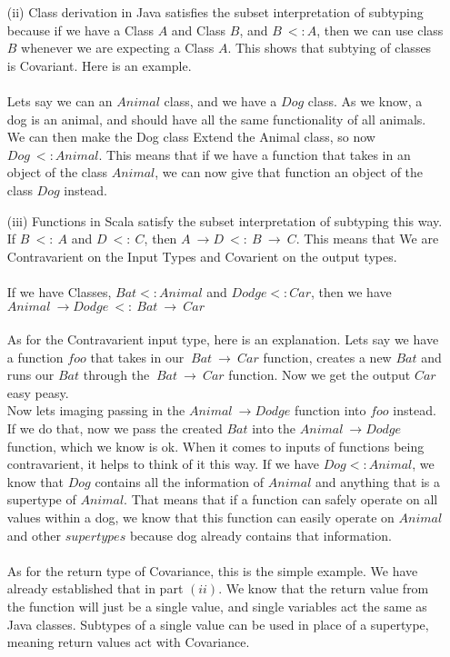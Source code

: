 \documentclass[11pt]{article}
\begin{document}
\begin{enumerate}
\begin{enumerate}
\begin{enumerate}
\item[(ii)]  Class derivation in Java satisfies the subset interpretation of subtyping because if we have a Class $A$ and Class $B$, and $B\ <: A$, then we can use class $B$ whenever we are expecting a Class $A$.  This shows that subtying of classes is Covariant.  Here is an example.
\\\\
Lets say we can an $Animal$ class, and we have a $Dog$ class.  As we know, a dog is an animal, and should have all the same functionality of all animals.  We can then make the Dog class Extend the Animal class, so now $Dog\ <: Animal$.  This means that if we have a function that takes in an object of the class $Animal$, we can now give that function an object of the class $Dog$ instead.\\
\item[(iii)]  Functions in Scala satisfy the subset interpretation of subtyping this way. \\
If $B\ <:\ A$ and $D\ <:\ C$, then $A\ \rightarrow D\ <:\ B\ \rightarrow\ C$.  This means that We are Contravarient on the Input Types and Covarient on the output types.\\ \\
If we have Classes, $Bat <: Animal$ and $Dodge <: Car$, then we have \\
$Animal\ \rightarrow Dodge\ <:\ Bat\ \rightarrow\ Car$
\\ \\
As for the Contravarient input type, here is an explanation.   Lets say we have a function $foo$ that takes in our $\ Bat\ \rightarrow\ Car$ function, creates a new $Bat$ and runs our $Bat$ through the  $\ Bat\ \rightarrow\ Car$ function.  Now we get the output $Car$ easy peasy.
\\ 
Now lets imaging passing in the $Animal\ \rightarrow Dodge$ function into $foo$ instead.  If we do that, now we pass the created $Bat$ into the $Animal\ \rightarrow Dodge$ function, which we know is ok.  When it comes to inputs of functions being contravarient, it helps to think of it this way.  If we have $Dog <: Animal$, we know that $Dog$ contains all the information of $Animal$ and anything that is a supertype of $Animal$.  That means that if a function can safely operate on all values within a dog, we know that this function can easily operate on $Animal$ and other $supertypes$ because dog already contains that information.\\ \\
As for the return type of Covariance, this is the simple example.  We have already established that in part $(ii)$.  We know that the return value from the function will just be a single value, and single variables act the same as Java classes.  Subtypes of a single value can be used in place of a supertype, meaning return values act with Covariance.

\end{enumerate}
\end{enumerate}
\end{enumerate}
\end{document}
